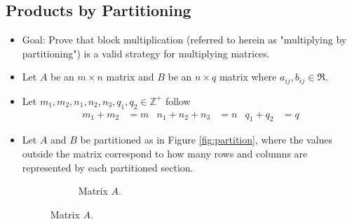 \documentclass[titlepage]{article}
\numberwithin{figure}{section}
\numberwithin{equation}{section}
\begin{document}
\subsection{Products by Partitioning}
\begin{itemize}
    \item Goal: Prove that block multiplication (referred to herein as "multiplying by partitioning") is a valid strategy for multiplying matrices.
    \item Let $A$ be an $m\times n$ matrix and $B$ be an $n\times q$ matrix where $a_{ij},b_{ij}\in\mathfrak{R}$.
    \item Let $m_1,m_2,n_1,n_2,n_3,q_1,q_2\in\mathbb{Z}^+$ follow
    \begin{align*}
        m_1+m_2 &= m & n_1+n_2+n_3 &= n & q_1+q_2 &= q
    \end{align*}
    \item Let $A$ and $B$ be partitioned as in Figure \ref{fig:partition}, where the values outside the matrix correspond to how many rows and columns are represented by each partitioned section.
    \begin{figure}[h!]
        \centering
        \begin{subfigure}[b]{0.3\linewidth}
            \centering
            \caption{Matrix $A$.}
            \label{fig:partitiona}
        \end{subfigure}

\end{figure}
\end{itemize}
\end{document}

